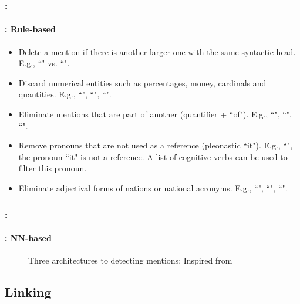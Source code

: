 \documentclass[xcolor=table]{beamer}
\begin{document}
\begin{frame}
	\frametitle{\insertshortsubtitle: \insertsection}
	\framesubtitle{\insertsubsection: Rule-based \cite{2013-lee-al}}
	
	\begin{itemize}
		\item Delete a mention if there is another larger one with the same syntactic head. 
		E.g., ``" vs. ``". 
		
		\item Discard numerical entities such as percentages, money, cardinals and quantities.
		E.g., ``", ``", ``".
		
		\item Eliminate mentions that are part of another (quantifier + ``of"). 
		E.g., ``", ``", ``".
		
		\item Remove pronouns that are not used as a reference (pleonastic ``it"). 
		E.g., ``", the pronoun ``it" is not a reference. 
		A list of cognitive verbs  can be used to filter this pronoun.
		
		\item Eliminate adjectival forms of nations or national acronyms.
		E.g., ``", ``", ``".
		
	\end{itemize}
	
\end{frame}


\begin{frame}
	\frametitle{\insertshortsubtitle: \insertsection}
	\framesubtitle{\insertsubsection: NN-based \cite{2020-yu-al}}
	
	\begin{figure}[ht]
		\centering
		\caption[Three architectures to detecting mentions]{Three architectures to detecting mentions; Inspired from \cite{2020-yu-al}}
		\label{fig:det-mention-yu}
	\end{figure}
	
\end{frame}



\subsection{Linking}
\end{document}
